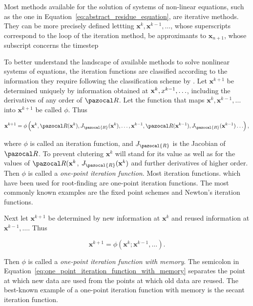 Most methods available for the solution of systems of non-linear equations, such as the one in Equation~\eqref{eq:abstract_residue_equation}, are iterative methods.
They can be more precisely defined lettting \(\mathbf x^{k},\mathbf x^{k-1}, \ldots\), whose superscripts correspond to the loop of the iteration method, be approximants to \(\mathbf x_{n+1}\), whose subscript concerns the timestep

To better understand the landscape of available methods to solve nonlinear systems of equations, the iteration functions are classified according to the information they require following the classification scheme by \cite{traub}.
Let \(\mathbf x^{k+1}\) be determined uniquely by information obtained at \(\mathbf x^{k}, \mathbf \mathbf x^{k-1}, \ldots\), including the derivatives of any order of \(\pazocal R\).
Let the function that maps \(\mathbf x^{k}, \mathbf x^{k-1}, \ldots\) into \(\mathbf x^{k+1}\) be called \(\phi\).
Thus
\begin{highlight}
\begin{equation}
  \mathbf x^{k+1}=\phi\left(\mathbf x^{k},\pazocal R(\mathbf x^{k}), J_\pazocal{R}(\mathbf x^k), \dots, \mathbf x^{k-1},\pazocal R(\mathbf x^{k-1}), J_\pazocal{R}(\mathbf x^{k-1}) \ldots\right),
\end{equation}
\end{highlight}
where \(\phi\) is called an iteration function, and \(J_\pazocal{R}\) is the Jacobian of \(\pazocal R\).
To prevent clutering \(\mathbf x^k\) will stand for its value as well as for the values of \(\pazocal R(\mathbf x^k\), \(J_\pazocal{R}(\mathbf x^k)\) and further derivatives of higher order.
Then \(\phi\) is called a \textit{one-point iteration function}.
Most iteration functions. which have been used for root-finding are one-point iteration functions. The most commonly known examples are the fixed point schemes and Newton's iteration functions.

Next let \(\mathbf x^{k+1}\) be determined by new information at \(\mathbf x^{k}\) and reused information at \(\mathbf x^{k-1}, \ldots\).
Thus
\begin{highlight}
  \begin{equation}\label{eq:one_point_iteration_function_with_memory}
    \mathbf x^{k+1}=\phi\left(\mathbf x^{k} ; \mathbf x^{k-1}, \ldots\right) .
  \end{equation}
\end{highlight}
Then \(\phi\) is called a \textit{one-point iteration function with memory}.
The semicolon in Equation~\eqref{eq:one_point_iteration_function_with_memory} separates the point at which new data are used from the points at which old data are reused.
The best-known example of a one-point iteration function with memory is the secant iteration function.

